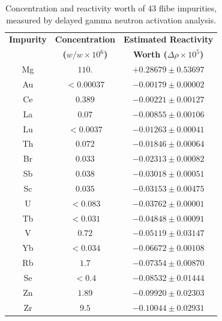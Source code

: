 \documentclass[11pt]{article}
\newcommand{\E}[1]{\times10^{#1}}
\begin{document}
\clearpage
\begin{table}[ht]\footnotesize
    \centering
    \caption{Concentration and reactivity worth of 43 flibe impurities, measured by delayed gamma neutron activation analysis.}
    \label{tab:concentration}
    \begin{tabular}{| c | c | c |} \hline
    \textbf{Impurity} & \textbf{Concentration} & \textbf{Estimated Reactivity} \\
                      & \textbf{($w/w \E{6}$)} & \textbf{Worth ($\Delta\rho \E{5}$)} \\ \hline
    Mg                & $110.$                 &   $+0.28679\pm0.53697$ \\ \hline
    Au                & $< 0.00037$            &   $-0.00179\pm0.00002$ \\ \hline
    Ce                &   $0.389$              &   $-0.00221\pm0.00127$ \\ \hline
    La                &   $0.07$               &   $-0.00855\pm0.00106$ \\ \hline
    Lu                & $< 0.0037$             &   $-0.01263\pm0.00041$ \\ \hline
    Th                &   $0.072$              &   $-0.01846\pm0.00064$ \\ \hline
    Br                &   $0.033$              &   $-0.02313\pm0.00082$ \\ \hline
    Sb                &   $0.038$              &   $-0.03018\pm0.00051$ \\ \hline
    Sc                &   $0.035$              &   $-0.03153\pm0.00475$ \\ \hline
    U                 & $< 0.083$              &   $-0.03762\pm0.00001$ \\ \hline
    Tb                & $< 0.031$              &   $-0.04848\pm0.00091$ \\ \hline
    V                 &   $0.72$               &   $-0.05119\pm0.03147$ \\ \hline
    Yb                & $< 0.034$              &   $-0.06672\pm0.00108$ \\ \hline
    Rb                &   $1.7$                &   $-0.07354\pm0.00870$ \\ \hline
    Se                & $< 0.4$                &   $-0.08532\pm0.01444$ \\ \hline
    Zn                &   $1.89$               &   $-0.09920\pm0.02303$ \\ \hline
    Zr                &   $9.5$                &   $-0.10044\pm0.02931$ \\ \hline

\end{tabular}
\end{table}
\end{document}
